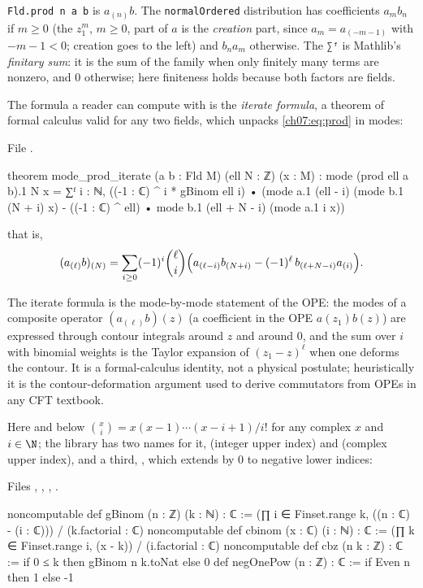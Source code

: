 \begin{dictionary}
\verb|Fld.prod n a b| is $a_{(n)}b$. The \verb|normalOrdered| distribution has coefficients
$a_m b_n$ if $m\ge 0$ (the $z_1^{m}$, $m\ge0$, part of $a$ is the \emph{creation} part, since
$a_m = a_{(-m-1)}$ with $-m-1<0$; creation goes to the left) and $b_n a_m$ otherwise. The
\verb|∑ᶠ| is Mathlib's \emph{finitary sum}: it is the sum of the family when only finitely many
terms are nonzero, and $0$ otherwise; here finiteness holds because both factors are fields.
\end{dictionary}

The formula a reader can compute with is the \emph{iterate formula}, a theorem of formal calculus
valid for any two fields, which unpacks \eqref{ch07:eq:prod} in modes:

\noindent File .
\begin{leancode}
theorem mode_prod_iterate (a b : Fld M) (ell N : ℤ) (x : M) :
    mode (prod ell a b).1 N x =
      ∑ᶠ i : ℕ, ((-1 : ℂ) ^ i * gBinom ell i) •
        (mode a.1 (ell - i) (mode b.1 (N + i) x)
          - ((-1 : ℂ) ^ ell) • mode b.1 (ell + N - i) (mode a.1 i x))
\end{leancode}

that is,
\begin{equation}\label{ch07:eq:iterate}
  (a_{(\ell)}b)_{(N)} = \sum_{i\ge0}(-1)^i\binom{\ell}{i}\Bigl(a_{(\ell-i)}b_{(N+i)} -
  (-1)^\ell\, b_{(\ell+N-i)}a_{(i)}\Bigr).
\end{equation}

\begin{physics}
The iterate formula is the mode-by-mode statement of the OPE: the modes of a composite operator $(a_{(\ell)}b)(z)$ (a coefficient in the OPE $a(z_1)b(z)$) are expressed through contour integrals around $z$ and around $0$, and the sum over $i$ with binomial weights is the Taylor expansion of $(z_1-z)^\ell$ when one deforms the contour. It is a formal-calculus identity, not a physical postulate; heuristically it is the contour-deformation argument used to derive commutators from OPEs in any CFT textbook.
\end{physics}
Here and below $\binom{x}{i} = x(x-1)\cdots(x-i+1)/i!$ for any complex $x$ and $i\in\N$; the
library has two names for it,  (integer upper index) and  (complex upper
index), and a third, , which extends  by $0$ to negative lower indices:

\noindent Files , , , .
\begin{leancode}
noncomputable def gBinom (n : ℤ) (k : ℕ) : ℂ :=
  (∏ i ∈ Finset.range k, ((n : ℂ) - (i : ℂ))) / (k.factorial : ℂ)
noncomputable def cbinom (x : ℂ) (i : ℕ) : ℂ :=
  (∏ k ∈ Finset.range i, (x - k)) / (i.factorial : ℂ)
noncomputable def cbz (n k : ℤ) : ℂ := if 0 ≤ k then gBinom n k.toNat else 0
def negOnePow (n : ℤ) : ℂ := if Even n then 1 else -1
\end{leancode}

